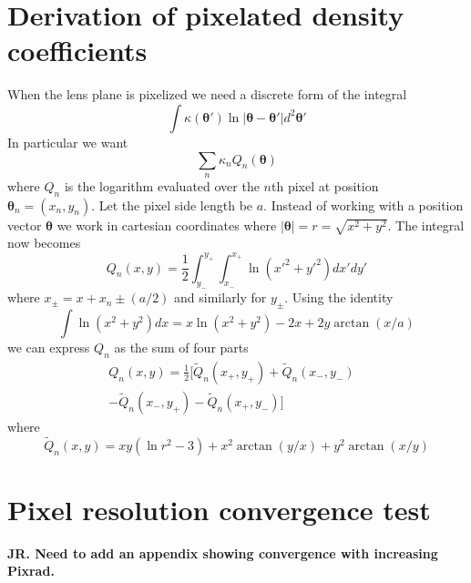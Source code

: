 \documentclass[galley,usenatbib]{mn2e}
\newcommand{\hilight}[1]{{\bf \color{red} #1}}
\renewcommand{\vec}[1]{\ensuremath{\boldsymbol{#1}}}
\begin{document}
\section{Derivation of pixelated density coefficients}
\label{Q derivation}
When the lens plane is pixelized we need a discrete form of the integral
%
\[\int \kappa(\vec\theta') \ln |\vec\theta-\vec\theta'| d^2\vec\theta' \]
%
In particular we want
%
\[\sum_n \kappa_n Q_n(\vec\theta)\]
%
where $Q_n$ is the logarithm evaluated over the $n$th pixel at position $\vec\theta_n = (x_n, y_n)$. Let the pixel side length be $a$.
Instead of working with a position vector $\vec\theta$ we work in cartesian coordinates where 
%
$|\vec\theta| = r = \sqrt{x^2 + y^2}$. The integral now becomes
%
\[Q_n(x,y) = \frac12 \int_{y_-}^{y_+}\int_{x_-}^{x_+} \ln (x'^2+y'^2) dx' dy'\]
%
where $x_\pm = x + x_n \pm (a/2)$ and similarly for $y_\pm$.
Using the identity
%
\[\int \ln(x^2+y^2) dx = x \ln(x^2+y^2) - 2x + 2y\arctan(x/a) \]
%
we can express $Q_n$ as the sum of four parts
%
\begin{align*}
Q_n(x,y) = \frac12 [\tilde Q_n(x_+,y_+)
                  + \tilde Q_n(x_-,y_-) & 
\\                - \tilde Q_n(x_-,y_+)
                  - \tilde Q_n(x_+,y_-) ]
\end{align*}
%
where
%
\[\tilde Q_n(x,y) = xy(\ln r^2 - 3) + x^2\arctan(y/x) + y^2\arctan(x/y)\]

\section{Pixel resolution convergence test}
\hilight{JR. Need to add an appendix showing convergence with increasing Pixrad.} 



\end{document}
